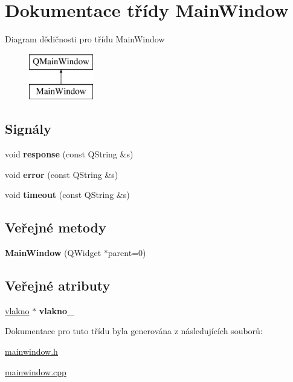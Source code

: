 \hypertarget{classMainWindow}{}\section{Dokumentace třídy Main\+Window}
\label{classMainWindow}
Diagram dědičnosti pro třídu Main\+Window\begin{figure}[H]
\begin{center}
\leavevmode
\includegraphics[height=2.000000cm]{classMainWindow}
\end{center}
\end{figure}
\subsection*{Signály}
\begin{DoxyCompactItemize}
\item 
\hypertarget{classMainWindow_a1f6f9ba9854e4ca94bc2181e7f49f998}{}void {\bfseries response} (const Q\+String \&s)\label{classMainWindow_a1f6f9ba9854e4ca94bc2181e7f49f998}

\item 
\hypertarget{classMainWindow_a88441edfd4ce88d65b614488276e7eb2}{}void {\bfseries error} (const Q\+String \&s)\label{classMainWindow_a88441edfd4ce88d65b614488276e7eb2}

\item 
\hypertarget{classMainWindow_adf524f9f5efaee681b3ee90c665613c9}{}void {\bfseries timeout} (const Q\+String \&s)\label{classMainWindow_adf524f9f5efaee681b3ee90c665613c9}

\end{DoxyCompactItemize}
\subsection*{Veřejné metody}
\begin{DoxyCompactItemize}
\item 
\hypertarget{classMainWindow_a8b244be8b7b7db1b08de2a2acb9409db}{}{\bfseries Main\+Window} (Q\+Widget $\ast$parent=0)\label{classMainWindow_a8b244be8b7b7db1b08de2a2acb9409db}

\end{DoxyCompactItemize}
\subsection*{Veřejné atributy}
\begin{DoxyCompactItemize}
\item 
\hypertarget{classMainWindow_af5c6e1352f5ef48557a0ecada11c3b3c}{}\hyperlink{classvlakno}{vlakno} $\ast$ {\bfseries vlakno\+\_\+}\label{classMainWindow_af5c6e1352f5ef48557a0ecada11c3b3c}

\end{DoxyCompactItemize}


Dokumentace pro tuto třídu byla generována z následujících souborů\+:\begin{DoxyCompactItemize}
\item 
\hyperlink{mainwindow_8h}{mainwindow.\+h}\item 
\hyperlink{mainwindow_8cpp}{mainwindow.\+cpp}\end{DoxyCompactItemize}

